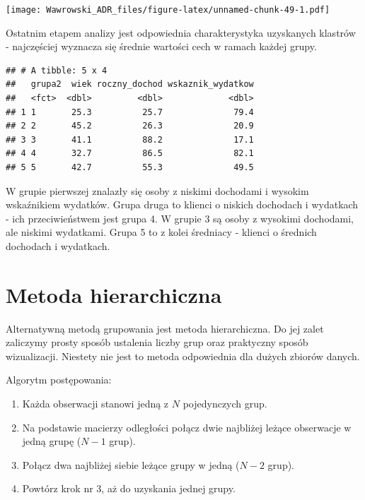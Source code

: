 \documentclass[]{book}
\newenvironment{Shaded}{\begin{snugshade}}{\end{snugshade}}
\newcommand{\DataTypeTok}[1]{\textcolor[rgb]{0.13,0.29,0.53}{#1}}
\newcommand{\KeywordTok}[1]{\textcolor[rgb]{0.13,0.29,0.53}{\textbf{#1}}}
\newcommand{\NormalTok}[1]{#1}
\newcommand{\OperatorTok}[1]{\textcolor[rgb]{0.81,0.36,0.00}{\textbf{#1}}}
\newcommand{\StringTok}[1]{\textcolor[rgb]{0.31,0.60,0.02}{#1}}
\providecommand{\tightlist}{%
  \setlength{\itemsep}{0pt}\setlength{\parskip}{0pt}}
\begin{document}
\texttt{[image: Wawrowski\_ADR\_files/figure-latex/unnamed-chunk-49-1.pdf]}

Ostatnim etapem analizy jest odpowiednia charakterystyka uzyskanych klastrów - najczęściej wyznacza się średnie wartości cech w ramach każdej grupy.

\begin{Shaded}
\end{Shaded}

\begin{verbatim}
## # A tibble: 5 x 4
##   grupa2  wiek roczny_dochod wskaznik_wydatkow
##   <fct>  <dbl>         <dbl>             <dbl>
## 1 1       25.3          25.7              79.4
## 2 2       45.2          26.3              20.9
## 3 3       41.1          88.2              17.1
## 4 4       32.7          86.5              82.1
## 5 5       42.7          55.3              49.5
\end{verbatim}

W grupie pierwszej znalazły się osoby z niskimi dochodami i wysokim wskaźnikiem wydatków. Grupa druga to klienci o niskich dochodach i wydatkach - ich przeciwieństwem jest grupa 4. W grupie 3 są osoby z wysokimi dochodami, ale niskimi wydatkami. Grupa 5 to z kolei średniacy - klienci o średnich dochodach i wydatkach.

\hypertarget{metoda-hierarchiczna}{%
\section{Metoda hierarchiczna}\label{metoda-hierarchiczna}}

Alternatywną metodą grupowania jest metoda hierarchiczna. Do jej zalet zaliczymy prosty sposób ustalenia liczby grup oraz praktyczny sposób wizualizacji. Niestety nie jest to metoda odpowiednia dla dużych zbiorów danych.

Algorytm postępowania:

\begin{enumerate}
\def\labelenumi{\arabic{enumi}.}
\tightlist
\item
  Każda obserwacji stanowi jedną z \(N\) pojedynczych grup.
\item
  Na podstawie macierzy odległości połącz dwie najbliżej leżące obserwacje w jedną grupę (\(N-1\) grup).
\item
  Połącz dwa najbliżej siebie leżące grupy w jedną (\(N-2\) grup).
\item
  Powtórz krok nr 3, aż do uzyskania jednej grupy.
\end{enumerate}
\end{document}
